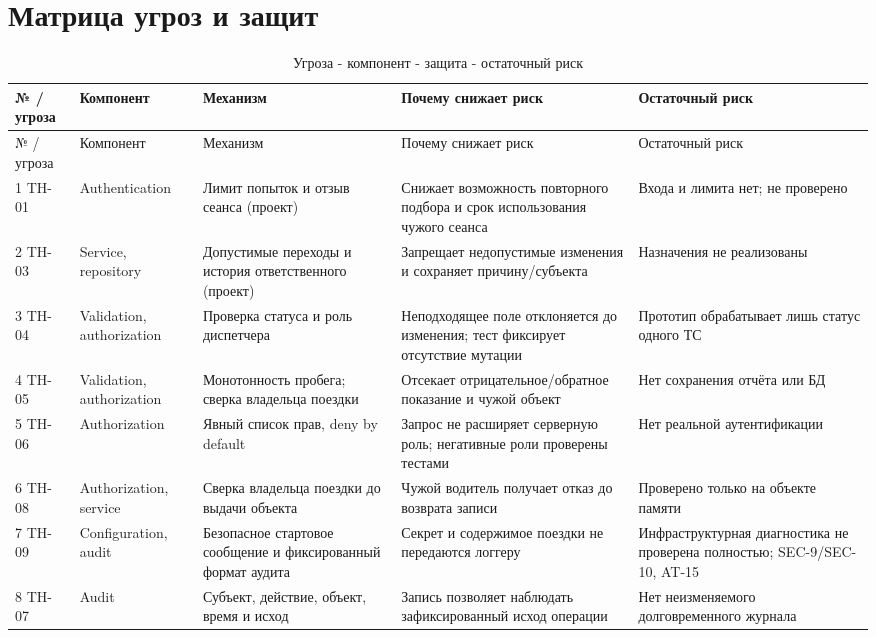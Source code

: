 \documentclass[12pt,a4paper]{article}
\begin{document}
\section{Матрица угроз и защит}
\begin{landscape}
\begin{longtable}{p{1.8cm}p{3.5cm}p{3.5cm}p{6cm}p{6.2cm}}
\caption{Угроза - компонент - защита - остаточный риск}\\
\toprule № / угроза & Компонент & Механизм & Почему снижает риск & Остаточный риск\\\midrule\endfirsthead
\toprule № / угроза & Компонент & Механизм & Почему снижает риск & Остаточный риск\\\midrule\endhead
1 TH-01 & Authentication & Лимит попыток и отзыв сеанса (проект) & Снижает возможность повторного подбора и срок использования чужого сеанса & Входа и лимита нет; не проверено\\
2 TH-03 & Service, repository & Допустимые переходы и история ответственного (проект) & Запрещает недопустимые изменения и сохраняет причину/субъекта & Назначения не реализованы\\
3 TH-04 & Validation, authorization & Проверка статуса и роль диспетчера & Неподходящее поле отклоняется до изменения; тест фиксирует отсутствие мутации & Прототип обрабатывает лишь статус одного ТС\\
4 TH-05 & Validation, authorization & Монотонность пробега; сверка владельца поездки & Отсекает отрицательное/обратное показание и чужой объект & Нет сохранения отчёта или БД\\
5 TH-06 & Authorization & Явный список прав, deny by default & Запрос не расширяет серверную роль; негативные роли проверены тестами & Нет реальной аутентификации\\
6 TH-08 & Authorization, service & Сверка владельца поездки до выдачи объекта & Чужой водитель получает отказ до возврата записи & Проверено только на объекте памяти\\
7 TH-09 & Configuration, audit & Безопасное стартовое сообщение и фиксированный формат аудита & Секрет и содержимое поездки не передаются логгеру & Инфраструктурная диагностика не проверена полностью; SEC-9/SEC-10, AT-15\\
8 TH-07 & Audit & Субъект, действие, объект, время и исход & Запись позволяет наблюдать зафиксированный исход операции & Нет неизменяемого долговременного журнала\\
\bottomrule
\end{longtable}
\end{landscape}
\end{document}
